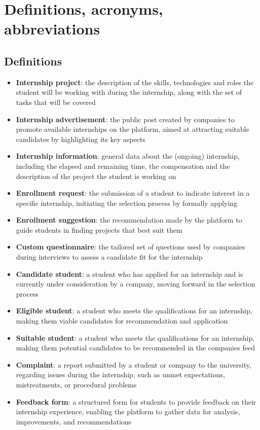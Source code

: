 \begin{enumerate}[label=\textbf{SP\arabic* -}]
\end{enumerate}

\section{Definitions, acronyms, abbreviations}

\subsection{Definitions}

\begin{itemize}
    \item \textbf{Internship project}: the description of the skills, technologies and roles the student will be working with during the internship, along with the set of tasks that will be covered
    \item \textbf{Internship advertisement}: the public post created by companies to promote available internships on the platform, aimed at attracting suitable candidates by highlighting its key aspects
    \item \textbf{Internship information}: general data about the (ongoing) internship, including the elapsed and remaining time, the compensation and the description of the project the student is working on
    \item \textbf{Enrollment request}: the submission of a student to indicate interest in a specific internship, initiating the selection process by formally applying
    \item \textbf{Enrollment suggestion}: the recommendation made by the platform to guide students in finding projects that best suit them
    \item \textbf{Custom questionnaire}: the tailored set of questions used by companies during interviews to assess a candidate fit for the internship
    \item \textbf{Candidate student}: a student who has applied for an internship and is currently under consideration by a company, moving forward in the selection process
    \item \textbf{Eligible student}: a student who meets the qualifications for an internship, making them viable candidates for recommendation and application
    \item \textbf{Suitable student}: a student who meets the qualifications for an internship, making them potential candidates to be recommended in the companies feed
    \item \textbf{Complaint}: a report submitted by a student or company to the university, regarding issues during the internship, such as unmet expectations, mistreatments, or procedural problems
    \item \textbf{Feedback form}: a structured form for students to provide feedback on their internship experience, enabling the platform to gather data for analysis, improvements, and recommendations
\end{itemize}

